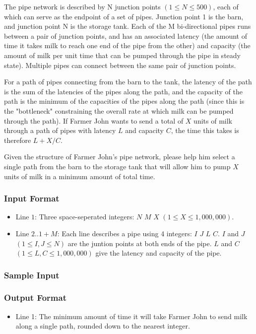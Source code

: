 The pipe network is described by N junction points $(1 \leq N \leq 500)$, each of which can serve as the endpoint of a set of pipes.  
Junction point 1 is the barn, and junction point N is the storage tank.  
Each of the M bi-directional pipes runs between a pair of junction points, and has an associated latency 
(the amount of time it takes milk to reach one end of the pipe from the other) and capacity (the amount of milk per unit time
that can be pumped through the pipe in steady state).  
Multiple pipes can connect between the same pair of junction points.

For a path of pipes connecting from the barn to the tank, the latency of the path is the sum of the latencies of the pipes along 
the path, and the capacity of the path is the minimum of the capacities of the pipes along the path (since this is the "bottleneck" 
constraining the overall rate at which milk can be pumped through the path).  
If Farmer John wants to send a total of $X$ units of milk through a path of pipes with latency $L$ and capacity $C$, the time this takes is therefore $L + X/C$.

Given the structure of Farmer John's pipe network, please help him select a single path from the barn to the storage tank that will allow him to pump $X$ units
of milk in a minimum amount of total time.

\subsubsection{Input Format}
\begin{itemize}
	\item Line $1$: Three space-seperated integers: $N$ $M$ $X$ $(1 \leq X \leq 1,000,000)$.
	\item Line $2..1+M$: Each line describes a pipe using 4 integers: $I$ $J$ $L$ $C$.
			$I$ and $J$ $(1 \leq I,J \leq N)$ are the juntion points at both ends of the pipe.
			$L$ and $C$ $(1 \leq L,C \leq 1,000,000)$ give the latency and capacity of the pipe.
\end{itemize}

\subsubsection{Sample Input}

\subsubsection{Output Format}
\begin{itemize}
	\item Line 1: The minimum amount of time it will take Farmer John to send milk along a single path, 
			rounded down to the nearest integer.
\end{itemize}

